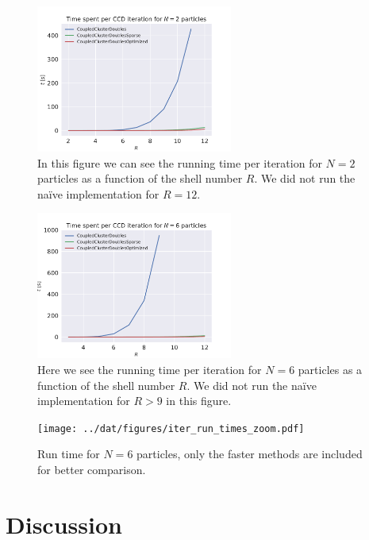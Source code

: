 \documentclass[
    a4paper, aps, twocolumn, floatfix, superscriptaddress,
    nofootinbib]{revtex4-1}
\newcommand{\1}{\mathds{1}}
\begin{document}
        \begin{figure}
            \centering
            \includegraphics[width=244px]
            {../dat/figures/iter_run_times_2.pdf}
            \caption{In this figure we can see the running time per iteration
            for $N = 2$ particles as a function of the shell number $R$. We did
            not run the naïve implementation for $R = 12$.}
            \label{fig:running_time_2}
        \end{figure}

        \begin{figure}
            \centering
            \includegraphics[width=244px]
            {../dat/figures/iter_run_times_6.pdf}
            \caption{Here we see the running time per iteration for $N = 6$
            particles as a function of the shell number $R$. We did not run the
            naïve implementation for $R > 9$ in this figure.}
            \label{fig:running_time_6}
        \end{figure}

        \begin{figure}
           \centering
            \texttt{[image: ../dat/figures/iter\_run\_times\_zoom.pdf]}
            \caption{Run time for $N=6$ particles, only the faster methods are
            included for better comparison.}
            \label{fig:running_time_6_zoom}            
        \end{figure}

\section{Discussion}
\end{document}
